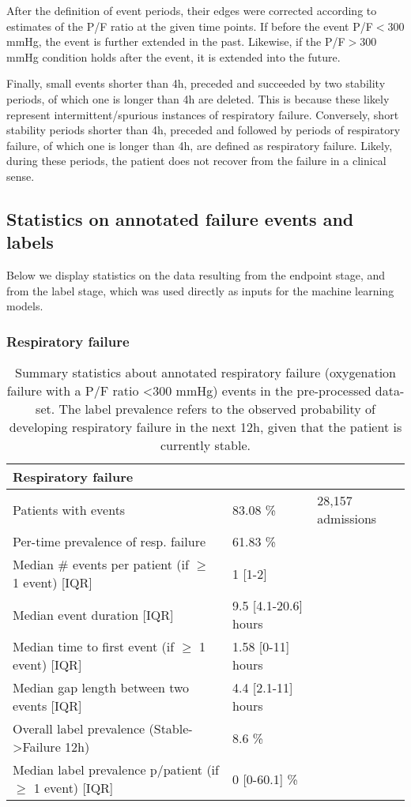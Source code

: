 \documentclass{article}
\begin{document}
After the definition of event periods, their edges were corrected according to estimates of the P/F ratio at the given time points. If before the event P/F$<300$ mmHg, the event is further extended in the past.  Likewise, if the P/F$>300$ mmHg condition holds after the event, it is extended into the future.

Finally, small events shorter than 4h, preceded and succeeded by two stability periods, of which one is longer than 4h are deleted. This is because these likely represent intermittent/spurious instances of respiratory failure. Conversely, short stability periods shorter than 4h, preceded and followed by periods of respiratory failure, of which one is longer than 4h, are defined as respiratory failure. Likely, during these periods, the patient does not recover from the failure in a clinical sense.

\subsection*{Statistics on annotated failure events and labels}

Below we display statistics on the data resulting from the endpoint stage, and from the label stage, which was used directly as inputs for the machine learning models.

\subsubsection*{Respiratory failure}

\begin{table}[ht!]
\caption{Summary statistics about annotated respiratory failure (oxygenation failure with a P/F ratio <300 mmHg) events in the pre-processed data-set. The
label prevalence refers to the observed probability of developing respiratory failure in the next 12h, given that the patient is currently stable.}
\footnotesize
\begin{center}
{\selectfont\small
\begin{tabular}{lll}
\toprule
\textbf{Respiratory failure} & & \\
\midrule
Patients with events & 83.08 \%  & 28,157 admissions \\
Per-time prevalence of resp. failure & 61.83 \% & \\ 
Median \# events per patient (if $\geq$ 1 event) [IQR] & 1 [1-2] & \\
Median event duration [IQR] & 9.5 [4.1-20.6] hours & \\
Median time to first event (if $\geq$ 1 event) [IQR] & 1.58 [0-11] hours  & \\
Median gap length between two events [IQR] & 4.4 [2.1-11] hours & \\
\midrule
Overall label prevalence (Stable->Failure 12h) & 8.6 \% & \\
Median label prevalence p/patient (if $\geq$ 1 event) [IQR] & 0 [0-60.1] \% \\
\bottomrule
\end{tabular}}
\end{center}
\label{tab:appendix-resp-failure-statistics}
\end{table}
\end{document}
